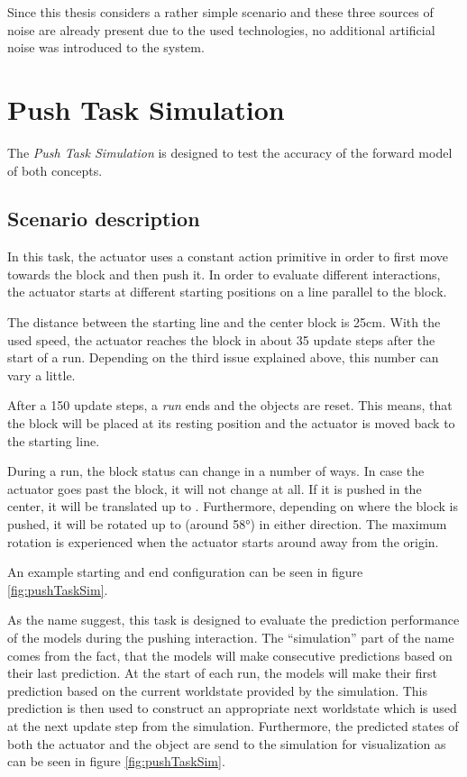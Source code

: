 Since this thesis considers a rather simple scenario and these three sources of noise are already present due to the used technologies,
no additional artificial noise was introduced to the system.

\section{Push Task Simulation \label{sec:pushTaskSim}}

The \textit{Push Task Simulation} is designed to test the accuracy of the forward model of both concepts. 

\subsection{Scenario description}

In this task, the actuator uses a constant action primitive in order to first move towards the block and then push it.
In order to evaluate different interactions, the actuator starts at different starting positions on a line parallel to the block. 

The distance between the starting line and the center block is 25cm. With the used speed, the actuator reaches the block in about 35 update steps after the start of a run. Depending on the third issue explained above, this number can vary a little.

After a 150 update steps, a \textit{run} ends and the objects are reset. This means, that the block will be placed at its resting position and the actuator is moved back to the starting line. 

During a run, the block status can change in a number of ways. In case the actuator goes past the block, it will not change at all. If it is pushed in the center, it will be translated up to . Furthermore, depending on where the block is pushed, it will be rotated up to  (around 58°) in either direction. The maximum rotation is experienced when the actuator starts around  away from the origin.

An example starting and end configuration can be seen in figure \ref{fig:pushTaskSim}. 

As the name suggest, this task is designed to evaluate the prediction performance of the models during the pushing interaction. The \enquote{simulation} part of the name comes from the fact, that the models will make consecutive predictions based on their last prediction. At the start of each run, the models will make their first prediction based on the current worldstate provided by the simulation. This prediction is then used to construct an appropriate next worldstate which is used at the next update step from the simulation.
Furthermore, the predicted states of both the actuator and the object are send to the simulation for visualization as can be seen in figure \ref{fig:pushTaskSim}.

